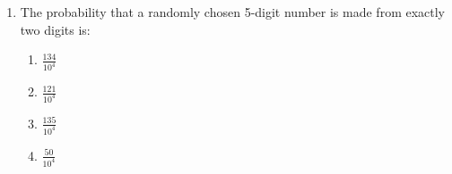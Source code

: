 \documentclass[journal,9pt,twocolumn]{IEEEtran}
\begin{document}
\begin{enumerate}
\item  The probability that a randomly chosen 5-digit number is made from exactly two digits is:
\begin{multicols}{4}
\begin{enumerate}
    \item $\frac{134}{10^4}$
    \item $\frac{121}{10^4}$
    \item $\frac{135}{10^4}$
    \item $\frac{50}{10^4}$
\end{enumerate}
\end{multicols}

\end{enumerate}
\end{document}
